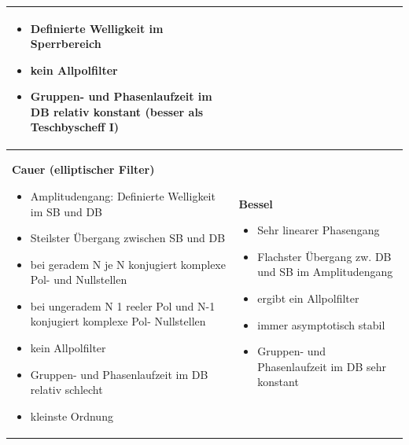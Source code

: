\begin{tabular}{|p{9cm}|p{9cm}|}
{	\begin{itemize}
    \item Definierte Welligkeit im Sperrbereich
    \item kein Allpolfilter
    \item Gruppen- und Phasenlaufzeit im DB relativ konstant \newline
          (besser als Teschbyscheff I)
	\end{itemize}
	} \\
\hline
\parbox[t]{6cm}{
	\textbf{Cauer (elliptischer Filter)} 
	\begin{itemize}
    \item Amplitudengang: Definierte Welligkeit im SB und DB
    \item Steilster Übergang zwischen SB und DB
    \item bei geradem N je N konjugiert komplexe Pol- und Nullstellen
    \item bei ungeradem N 1 reeler Pol und N-1 konjugiert komplexe Pol- Nullstellen
    \item kein Allpolfilter
    \item Gruppen- und Phasenlaufzeit im DB relativ schlecht
    \item kleinste Ordnung
	\end{itemize}
	}
& 
\parbox[t]{6cm}{
	\textbf{Bessel} 
	\begin{itemize}
    \item Sehr linearer Phasengang
    \item Flachster Übergang zw. DB und SB im Amplitudengang
    \item ergibt ein Allpolfilter
    \item immer asymptotisch stabil
    \item Gruppen- und Phasenlaufzeit im DB sehr konstant
	\end{itemize}
	} \\
\hline
\end{tabular}
\vfill

